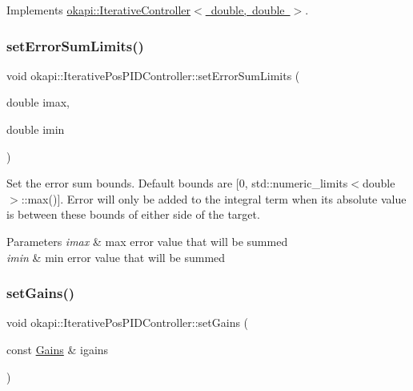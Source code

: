Implements \mbox{\hyperlink{classokapi_1_1IterativeController_a7c514b702b78be6c45c03b718edce035}{okapi\+::\+Iterative\+Controller$<$ double, double $>$}}.

\mbox{\label{classokapi_1_1IterativePosPIDController_a76fc3c387e87ff2c6e08c54b8670eeb4}} 
\subsubsection{\texorpdfstring{setErrorSumLimits()}{setErrorSumLimits()}}
{\footnotesize\ttfamily void okapi\+::\+Iterative\+Pos\+P\+I\+D\+Controller\+::set\+Error\+Sum\+Limits (\begin{DoxyParamCaption}\item[{double}]{imax,  }\item[{double}]{imin }\end{DoxyParamCaption})\hspace{0.3cm}{\ttfamily [virtual]}}

Set the error sum bounds. Default bounds are \mbox{[}0, std\+::numeric\+\_\+limits$<$double$>$\+::max()\mbox{]}. Error will only be added to the integral term when its absolute value is between these bounds of either side of the target.


\begin{DoxyParams}{Parameters}
{\em imax} & max error value that will be summed \\
\hline
{\em imin} & min error value that will be summed \\
\hline
\end{DoxyParams}
\mbox{\label{classokapi_1_1IterativePosPIDController_ae42e06f7c23ddff49cc2576f8417ce00}} 
\subsubsection{\texorpdfstring{setGains()}{setGains()}}
{\footnotesize\ttfamily void okapi\+::\+Iterative\+Pos\+P\+I\+D\+Controller\+::set\+Gains (\begin{DoxyParamCaption}\item[{const \mbox{\hyperlink{structokapi_1_1IterativePosPIDController_1_1Gains}{Gains}} \&}]{igains }\end{DoxyParamCaption})\hspace{0.3cm}{\ttfamily [virtual]}}

